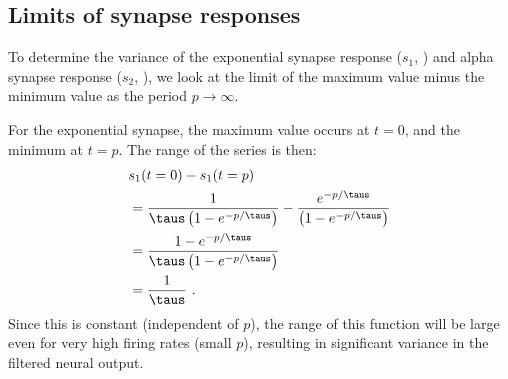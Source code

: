 \begin{appendices}
\section{Limits of synapse responses}

To determine the variance of the
exponential synapse response ($s_1$, ) and
alpha synapse response ($s_2$, ),
we look at the limit of the maximum value minus the minimum value
as the period $p \to \infty$.

For the exponential synapse, the maximum value occurs at $t = 0$,
and the minimum at $t = p$.
The range of the series is then:
\newcommand{\zp}{e^{-p/\taus}}
\newcommand{\zpa}{1 - \zp}
\newcommand{\zpb}{\left(\zpa\right)}
\newcommand{\zt}{\exp{-t/\taus}}
\begin{align}
  & s_1(t = 0) - s_1(t = p) \\
  &= \frac{1}{\taus\zpb} - \frac{\zp}{\zpb} \\
  &= \frac{\zpa}{\taus\zpb} \\
  &= \frac{1}{\taus} \text{ .}
\end{align}
Since this is constant (independent of $p$),
the range of this function will be large even for very high firing rates (small $p$),
resulting in significant variance in the filtered neural output.


\end{appendices}
